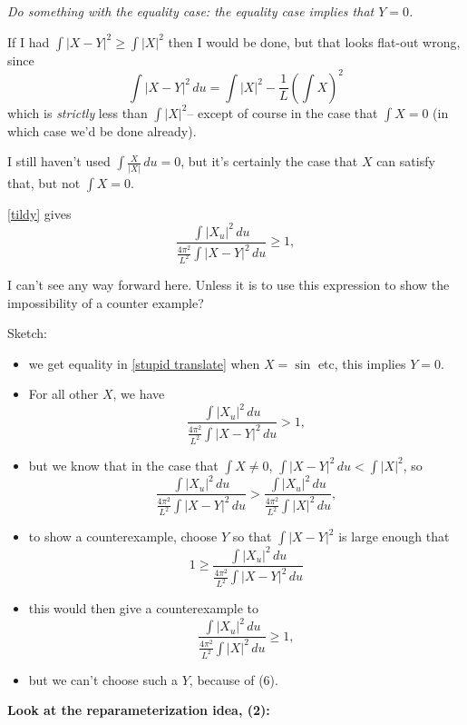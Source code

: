 \documentclass{amsart}
\begin{document}
\emph{Do something with the equality case:  the equality case implies that $Y=0$.}

If I had $\int|X-Y|^2\ge\int|X|^2$ then I would be done, but that looks flat-out wrong, since 
\[\int |X-Y|^2 \, du = \int |X|^2- \frac1L\left(\int X\right)^2\]
which is \emph{strictly} less than $\int |X|^2$-- except of course in the case that $\int X=0$ (in which case we'd be done already).   

I still haven't used $\int \frac{X}{|X|}\,du=0$, but it's certainly the case that $X$ can satisfy that, but not $\int X=0$.  

\eqref{tildy} gives 
\begin{equation}\frac{ \int |{X}_u|^2 \,du}{ \frac{4\pi^2}{L^2}\int |{X}-Y|^2\,du }\ge 1, \label{stupid translate} \end{equation}

I can't see any way forward here.   Unless it is to use this expression to show the impossibility of a counter example?

Sketch:   \begin{itemize}
\item we get equality in \eqref{stupid translate} when $X=\sin $ etc, this implies $Y=0$. 
\item For all other $X$, we have
\begin{equation}\frac{ \int |{X}_u|^2 \,du}{ \frac{4\pi^2}{L^2}\int |{X}-Y|^2\,du }> 1,  \end{equation}
\item but we know that in the case that $\int X\not=0$, $\int |{X}-Y|^2\,du < \int |X|^2$, so 
\begin{equation}
\frac{ \int |{X}_u|^2 \,du}{ \frac{4\pi^2}{L^2}\int |{X}-Y|^2\,du }> \frac{ \int |{X}_u|^2 \,du}{ \frac{4\pi^2}{L^2}\int |{X}|^2\,du },  \end{equation}
\item to show a counterexample, choose $Y$ so that $\int |X-Y|^2$ is large enough that 
\[1\ge \frac{ \int |{X}_u|^2 \,du}{ \frac{4\pi^2}{L^2}\int |{X}-Y|^2\,du }\]
\item this would then give a counterexample to 
\begin{equation}\frac{ \int |{X}_u|^2 \,du}{ \frac{4\pi^2}{L^2}\int |{X}|^2\,du }\ge 1,  \end{equation}
\item but we can't choose such a $Y$, because of (6).
\end{itemize}
\bigskip

\textbf{Look at the reparameterization idea, (2):}
\end{document}
